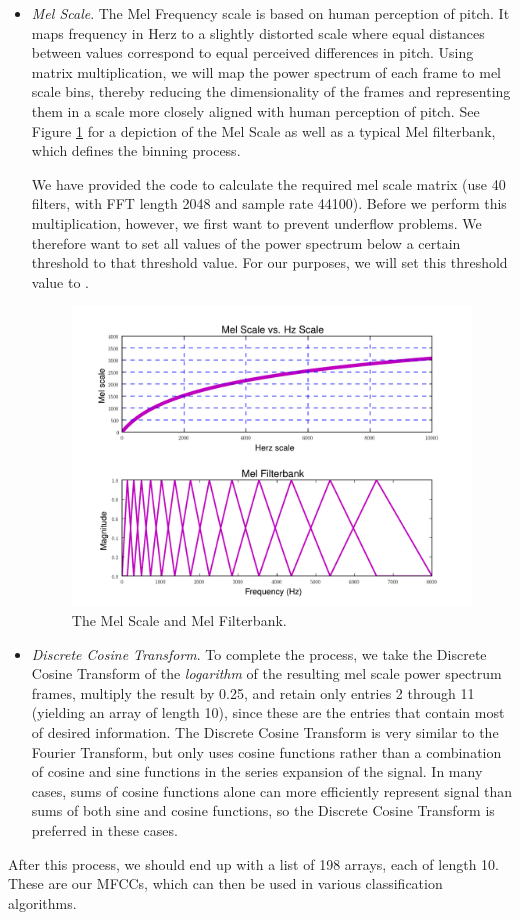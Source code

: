 \begin{itemize}
\item \emph{Mel Scale}. The Mel Frequency scale is based on human perception of pitch. It maps frequency
in Herz to a slightly distorted scale where equal distances between values correspond to equal perceived
differences in pitch. Using matrix multiplication, we will map the power spectrum of each frame to
mel scale bins, thereby reducing the dimensionality of the frames and representing them in a scale
more closely aligned with human perception of pitch. See Figure \ref{fourierext:mel} for a depiction
of the Mel Scale as well as a typical Mel filterbank, which defines the binning process.

We have provided the code to calculate the required mel scale
matrix (use 40 filters, with FFT length 2048 and sample rate 44100).
Before we perform this multiplication, however, we first want to prevent underflow problems. We
therefore want to set all values of the power spectrum below a certain threshold to that threshold value.
For our purposes, we will set this threshold value to .

\begin{figure}
\centering
\includegraphics[width=\textwidth]{melScale.pdf}
\caption{The Mel Scale and Mel Filterbank.}
\label{fourierext:mel}
\end{figure}

\item \emph{Discrete Cosine Transform}. To complete the process, we take the Discrete Cosine Transform
of the \emph{logarithm} of the resulting mel scale power spectrum frames, multiply the result by 0.25, and retain only entries 2
through 11 (yielding an array of length 10), since these are the entries that contain most of desired
information. The Discrete Cosine Transform is very similar to the Fourier Transform, but only uses
cosine functions rather than a combination of cosine and sine functions in the series expansion of the
signal. In many cases, sums of cosine functions alone can more efficiently represent signal than
sums of both sine and cosine functions, so the Discrete Cosine Transform is preferred in these cases.
\end{itemize}
After this process, we should end up with a list of 198 arrays, each of length 10. These are our MFCCs,
which can then be used in various classification algorithms.

